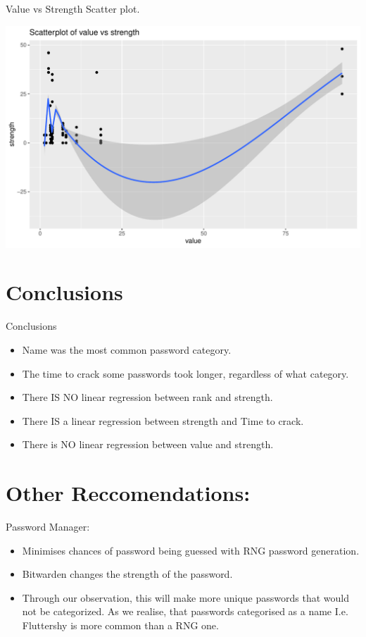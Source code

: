 \documentclass[10pt,ignorenonframetext,aspectratio=169]{beamer}
\providecommand{\tightlist}{%
  \setlength{\itemsep}{0pt}\setlength{\parskip}{0pt}}
\begin{document}
\begin{frame}{Value vs Strength Scatter plot.}
\protect\hypertarget{value-vs-strength-scatter-plot.}{}
\begin{center}\includegraphics[width=0.8\linewidth]{Untitled_files/figure-beamer/scatterAttempt-1} \end{center}
\end{frame}

\hypertarget{conclusions}{%
\section{Conclusions}\label{conclusions}}

\begin{frame}{Conclusions}
\begin{itemize}
\tightlist
\item
  Name was the most common password category.
\item
  The time to crack some passwords took longer, regardless of what
  category.
\item
  There IS NO linear regression between rank and strength.
\item
  There IS a linear regression between strength and Time to crack.
\item
  There is NO linear regression between value and strength.
\end{itemize}
\end{frame}

\hypertarget{other-reccomendations}{%
\section{Other Reccomendations:}\label{other-reccomendations}}

\begin{frame}{Password Manager:}
\protect\hypertarget{password-manager}{}
\begin{itemize}
\tightlist
\item
  Minimises chances of password being guessed with RNG password
  generation.
\item
  Bitwarden changes the strength of the password.
\item
  Through our observation, this will make more unique passwords that
  would not be categorized. As we realise, that passwords categorised as
  a name I.e. Fluttershy is more common than a RNG one.
\end{itemize}
\end{frame}
\end{document}
